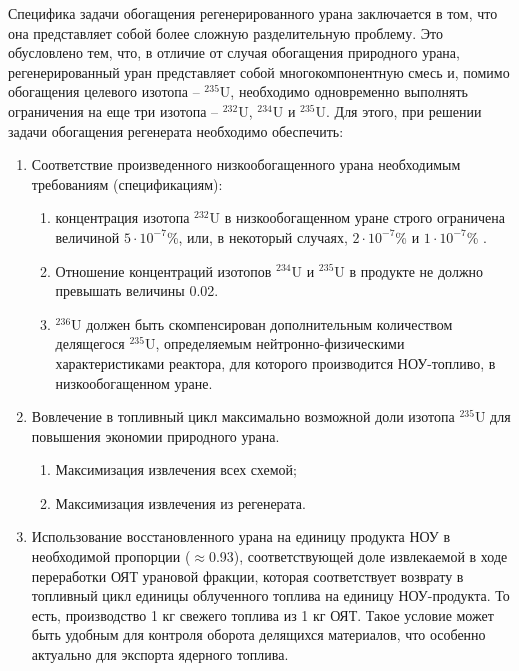Специфика задачи обогащения регенерированного урана заключается в том, что она представляет собой более сложную разделительную проблему.
Это обусловлено тем, что, в отличие от случая обогащения природного урана, регенерированный уран представляет собой многокомпонентную смесь и, помимо обогащения целевого изотопа -- $^{235}$U, необходимо одновременно выполнять ограничения на еще три изотопа -- $^{232}$U, $^{234}$U и $^{235}$U.
Для этого, при решении задачи обогащения регенерата необходимо обеспечить:
\begin{enumerate}
  \item Соответствие произведенного низкообогащенного урана необходимым требованиям (спецификациям):
  \begin{enumerate}
    \item концентрация изотопа $^{232}$U в низкообогащенном уране строго ограничена величиной $5\cdot10^{-7}$\%, или, в некоторый случаях, $2\cdot10^{-7}$\% и $1\cdot10^{-7}$\% \cite{smirnovKaskadnyeShemyZadachah2012, c26committeeSpecificationUraniumHexafluoride}.
    \item Отношение концентраций изотопов $^{234}$U и $^{235}$U в продукте не должно превышать величины 0.02.
    \item $^{236}$U должен быть скомпенсирован дополнительным количеством делящегося $^{235}$U, определяемым нейтронно-физическими характеристиками реактора, для которого производится НОУ-топливо, в низкообогащенном уране.
  \end{enumerate}
  \item Вовлечение в топливный цикл максимально возможной доли изотопа $^{235}$U для повышения экономии природного урана.
  \begin{enumerate}
    \item Максимизация извлечения всех схемой;
    \item Максимизация извлечения из регенерата.
  \end{enumerate}
  \item Использование восстановленного урана на единицу продукта НОУ в необходимой пропорции ($\approx$0.93), соответствующей доле извлекаемой в ходе переработки ОЯТ урановой фракции, которая соответствует возврату в топливный цикл единицы облученного топлива на единицу НОУ-продукта. То есть, производство 1 кг свежего топлива из 1 кг ОЯТ. Такое условие может быть удобным для контроля оборота делящихся материалов, что особенно актуально для экспорта ядерного топлива.
\end{enumerate}


